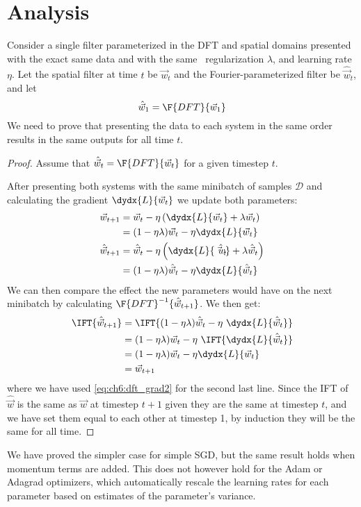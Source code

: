 \section{Analysis}
Consider a single filter parameterized in the DFT and spatial domains
presented with the exact same data and with the same \ltwo\ regularization
$\lambda$, and learning rate $\eta$. Let
the spatial filter at time $t$ be $\vec{w}_t$ and the Fourier-parameterized
filter be $\hat{\vec{w}}_t$, and let 
\begin{equation}
  \hat{\vec{w}}_1 = \F{DFT}\{\vec{w}_1\} \label{eq:ch6:initial_condition}
\end{equation}
We need to prove that presenting the data to each system in the same order
results in the same outputs for all time $t$.
%
\begin{proof}
  Assume that $\hat{\vec{w}}_t = \F{DFT}\{\vec{w}_t\}$ for a given timestep $t$.

After presenting both systems with the same minibatch of samples $\mathcal{D}$
and calculating the gradient $\dydx{L}{\vec{w}_t}$ we update both parameters:
\begin{align}
  \vec{w}_{t+1} & =  \vec{w}_t - \eta \left(
    \dydx{L}{\vec{w}_t} + \lambda \vec{w}_t \right) \\
    &= (1-\eta\lambda)\vec{w}_t - \eta \dydx{L}{\vec{w}_t} \\
    \hat{\vec{w}}_{t+1} & =  \hat{\vec{w}}_t - \eta \left(
     \dydx{L}{\hat{\vec{w}_t}} + \lambda \hat{\vec{w}}_t \right)  \\
     &= (1-\eta\lambda)\hat{\vec{w}}_t - \eta \dydx{L}{\hat{\vec{w}}_t} 
\end{align}
We can then compare the effect the new parameters would have on the next
minibatch by calculating $\F{DFT}^{-1} \{\hat{\vec{w}}_{t+1} \}$. We then get:
\begin{align}
  \IFT{\hat{\vec{w}}_{t+1}} &= \IFT{(1-\eta\lambda)\hat{\vec{w}}_t - \eta\ \dydx{L}{\hat{\vec{w}}_t}} \\       
                        & =  (1-\eta\lambda)\vec{w}_t - \eta\ \IFT{\dydx{L}{\hat{\vec{w}}_t}} \\
                        & =  (1-\eta\lambda)\vec{w}_t - \eta \dydx{L}{\vec{w}_t} \\
                        & =  \vec{w}_{t+1}
\end{align}
where we have used \eqref{eq:ch6:dft_grad2} for the second last line.
Since the IFT of $\hat{\vec{w}}$ is the same as $\vec{w}$ at timestep $t+1$ given
they are the same at timestep $t$, and we have set them equal to each other at
timestep 1, by induction they will be the same for all time.
\end{proof}
We have proved the simpler case for simple SGD, but the same result holds when
momentum terms are added. This does not however hold for the Adam \cite{kingma_adam:_2014} or Adagrad
\cite{duchi_adaptive_2011} optimizers, which automatically rescale the learning
rates for each parameter based on estimates of the parameter's variance.

